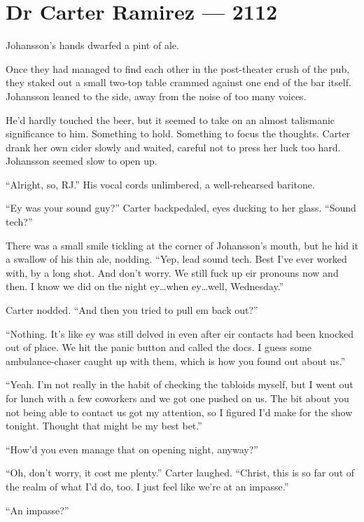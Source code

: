 \hypertarget{dr-carter-ramirez-2112}{%
\chapter*{Dr Carter Ramirez — 2112}\label{dr-carter-ramirez-2112}}

Johansson's hands dwarfed a pint of ale.

Once they had managed to find each other in the post-theater crush of the pub, they staked out a small two-top table crammed against one end of the bar itself. Johansson leaned to the side, away from the noise of too many voices.

He'd hardly touched the beer, but it seemed to take on an almost talismanic significance to him. Something to hold. Something to focus the thoughts. Carter drank her own cider slowly and waited, careful not to press her luck too hard. Johansson seemed slow to open up.

``Alright, so, RJ.'' His vocal cords unlimbered, a well-rehearsed baritone.

``Ey was your sound guy?'' Carter backpedaled, eyes ducking to her glass. ``Sound tech?''

There was a small smile tickling at the corner of Johansson's mouth, but he hid it a swallow of his thin ale, nodding. ``Yep, lead sound tech. Best I've ever worked with, by a long shot. And don't worry. We still fuck up eir pronouns now and then. I know we did on the night ey\ldots{}when ey\ldots{}well, Wednesday.''

Carter nodded. ``And then you tried to pull em back out?''

``Nothing. It's like ey was still delved in even after eir contacts had been knocked out of place. We hit the panic button and called the docs. I guess some ambulance-chaser caught up with them, which is how you found out about us.''

``Yeah. I'm not really in the habit of checking the tabloids myself, but I went out for lunch with a few coworkers and we got one pushed on us. The bit about you not being able to contact us got my attention, so I figured I'd make for the show tonight. Thought that might be my best bet.''

``How'd you even manage that on opening night, anyway?''

``Oh, don't worry, it cost me plenty.'' Carter laughed. ``Christ, this is so far out of the realm of what I'd do, too. I just feel like we're at an impasse.''

``An impasse?''


